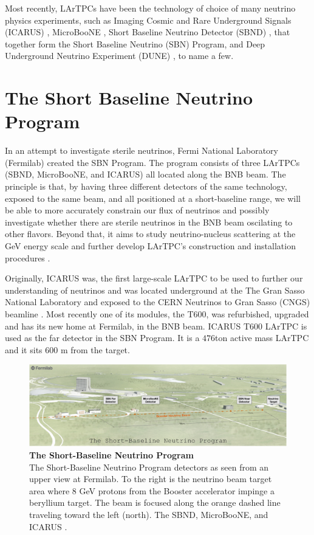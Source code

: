 Most recently, LArTPCs have been the technology of choice of many neutrino physics experiments, such as Imaging Cosmic and Rare Underground Signals (ICARUS) \cite{ICARUS_proposal}, MicroBooNE \cite{microboone_proposal}, Short Baseline Neutrino Detector (SBND) \cite{SBND}, that together form the Short Baseline Neutrino (SBN) Program, and Deep Underground Neutrino Experiment (DUNE) \cite{dune_snowmass_22}, to name a few. 

\section{The Short Baseline Neutrino Program}

In an attempt to investigate sterile neutrinos, Fermi National Laboratory (Fermilab) created the SBN Program. The program consists of three LArTPCs (SBND, MicroBooNE, and ICARUS) all located along the BNB beam. The principle is that, by having three different detectors of the same technology, exposed to the same beam, and all positioned at a short-baseline range, we will be able to more accurately constrain our flux of neutrinos and possibly investigate whether there are sterile neutrinos in the BNB beam oscilating to other flavors. Beyond that, it aims to study neutrino-nucleus scattering at the GeV energy scale and further develop LArTPC's construction and installation procedures \cite{SBN}.

Originally, ICARUS was, the first large-scale LArTPC to be used to further our understanding of neutrinos and was located underground at the The Gran Sasso National Laboratory and exposed to the CERN Neutrinos to Gran Sasso (CNGS) beamline \cite{ICARUS_proposal}. Most recently one of its modules, the T600, was refurbished, upgraded and has its new home at Fermilab, in the BNB beam. ICARUS T600 LArTPC is used as the far detector in the SBN Program. It is a $476$ton active mass LArTPC and it sits $600$ m from the target. 

\begin{figure}[h!]
	\begin{center}
		\includegraphics[scale=0.32]{Figures/SBN.png}
		\caption[The Short-Baseline Neutrino Program]{\textbf{The Short-Baseline Neutrino Program}\\The Short-Baseline Neutrino Program detectors as seen from an upper view at Fermilab. To the right is the neutrino beam target area where $8$ GeV protons from the Booster accelerator impinge a beryllium target. The beam is focused along the orange dashed line traveling toward the left (north). The SBND, MicroBooNE, and ICARUS \cite{SBN}.
		}
		\label{sbn_program}
	\end{center}
\end{figure}

